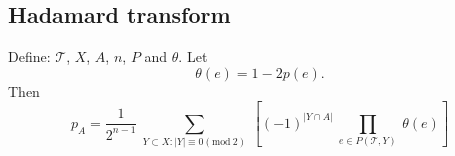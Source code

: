 \subsection*{Hadamard transform}

Define: $\mathcal{T}$, $X$, $A$, $n$, $P$ and $\theta$.
Let
$$
\theta(e) = 1-2p(e).
$$
Then
$$
p_A = \frac{1}{2^{n-1}} \ \sum_{Y \subset X : |Y| \equiv 0 (\mathrm{mod} \ 2)} \ \left[(-1)^{|Y \cap A|} \ \prod_{e \in P(\mathcal{T}, Y)} \ \theta(e) \right]
$$


\topoInconsist*
